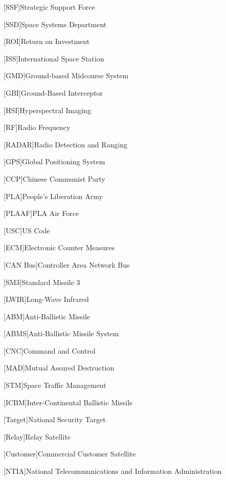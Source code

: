 
[SSF]{Strategic Support Force}

[SSD]{Space Systems Department}

[ROI]{Return on Investment}

[ISS]{International Space Station}

[GMD]{Ground-based Midcourse System}

[GBI]{Ground-Based Interceptor}

[HSI]{Hyperspectral Imaging}

[RF]{Radio Frequency}

[RADAR]{Radio Detection and Ranging}

[GPS]{Global Positioning System}

[CCP]{Chinese Communist Party}

[PLA]{People's Liberation Army}

[PLAAF]{PLA Air Force}

[USC]{US Code}

[ECM]{Electronic Counter Measures}

[CAN Bus]{Controller Area Network Bus}

[SM3]{Standard Missile 3}

[LWIR]{Long-Wave Infrared}

[ABM]{Anti-Ballistic Missile}

[ABMS]{Anti-Ballistic Missile System}

[CNC]{Command and Control}

[MAD]{Mutual Assured Destruction}

[STM]{Space Traffic Management}

[ICBM]{Inter-Continental Ballistic Missile}

[Target]{National Security Target}

[Relay]{Relay Satellite}

[Customer]{Commercial Customer Satellite}

[NTIA]{National Telecommunications and Information
  Administration}

